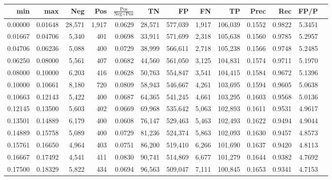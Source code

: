 \begin{tabular}{rrrrrrrrrrrrr}
\toprule
    min &     max &    Neg &   Pos & $\frac{\text{Pos}}{\text{Neg}+\text{Pos}}$ &      TN &      FP &      FN &      TP &   Prec &    Rec &   FP/P \\
\midrule
0.00000 & 0.01648 & 28,571 & 1,917 &                                     0.0629 &  28,571 & 577,039 &   1,917 & 106,039 & 0.1552 & 0.9822 & 5.3451 \\
0.01667 & 0.04706 &  5,340 &   401 &                                     0.0698 &  33,911 & 571,699 &   2,318 & 105,638 & 0.1560 & 0.9785 & 5.2957 \\
0.04706 & 0.06236 &  5,088 &   400 &                                     0.0729 &  38,999 & 566,611 &   2,718 & 105,238 & 0.1566 & 0.9748 & 5.2485 \\
0.06250 & 0.08000 &  5,561 &   407 &                                     0.0682 &  44,560 & 561,050 &   3,125 & 104,831 & 0.1574 & 0.9711 & 5.1970 \\
0.08000 & 0.10000 &  6,203 &   416 &                                     0.0628 &  50,763 & 554,847 &   3,541 & 104,415 & 0.1584 & 0.9672 & 5.1396 \\
0.10000 & 0.10661 &  8,180 &   720 &                                     0.0809 &  58,943 & 546,667 &   4,261 & 103,695 & 0.1594 & 0.9605 & 5.0638 \\
0.10663 & 0.12143 &  5,422 &   400 &                                     0.0687 &  64,365 & 541,245 &   4,661 & 103,295 & 0.1603 & 0.9568 & 5.0136 \\
0.12145 & 0.13500 &  5,603 &   402 &                                     0.0669 &  69,968 & 535,642 &   5,063 & 102,893 & 0.1611 & 0.9531 & 4.9617 \\
0.13501 & 0.14889 &  6,179 &   400 &                                     0.0608 &  76,147 & 529,463 &   5,463 & 102,493 & 0.1622 & 0.9494 & 4.9044 \\
0.14889 & 0.15758 &  5,089 &   400 &                                     0.0729 &  81,236 & 524,374 &   5,863 & 102,093 & 0.1630 & 0.9457 & 4.8573 \\
0.15761 & 0.16650 &  4,964 &   403 &                                     0.0751 &  86,200 & 519,410 &   6,266 & 101,690 & 0.1637 & 0.9420 & 4.8113 \\
0.16667 & 0.17492 &  4,541 &   411 &                                     0.0830 &  90,741 & 514,869 &   6,677 & 101,279 & 0.1644 & 0.9382 & 4.7692 \\
0.17500 & 0.18329 &  5,822 &   434 &                                     0.0694 &  96,563 & 509,047 &   7,111 & 100,845 & 0.1653 & 0.9341 & 4.7153 \\

\end{tabular}
